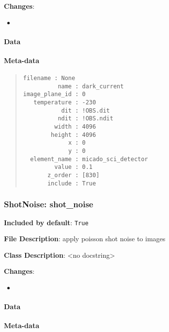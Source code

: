\textbf{Changes}:

\begin{itemize}
\item \end{itemize}


\paragraph{Data%
  \label{id5}%
}


\paragraph{Meta-data%
  \label{id6}%
}

\begin{quote}
\begin{alltt}
\begin{lstlisting}[frame=single]
      filename : None
          name : dark_current
image_plane_id : 0
   temperature : -230
           dit : !OBS.dit
          ndit : !OBS.ndit
         width : 4096
        height : 4096
             x : 0
             y : 0
  element_name : micado_sci_detector
         value : 0.1
       z_order : [830]
       include : True
\end{lstlisting}
\end{alltt}
\end{quote}


\subsubsection{ShotNoise: \textquotedbl{}shot\_noise\textquotedbl{}%
  \label{shotnoise-shot-noise}%
}

\textbf{Included by default}: \texttt{True}

\textbf{File Description}: apply poisson shot noise to images

\textbf{Class Description}: <no docstring>

\textbf{Changes}:

\begin{itemize}
\item \end{itemize}


\paragraph{Data%
  \label{id7}%
}


\paragraph{Meta-data%
  \label{id8}%
}

